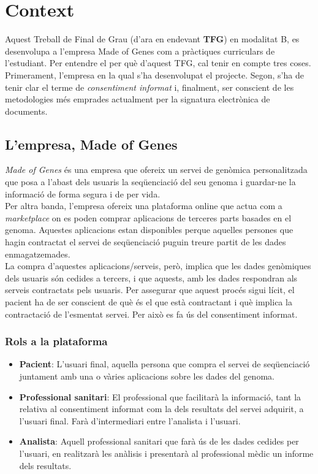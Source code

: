 \section{Context}

Aquest Treball de Final de Grau (d'ara en endevant \textbf{TFG}) en modalitat B, es desenvolupa a l'empresa Made of Genes\cite{mog} com a pràctiques curriculars de l'estudiant.
\newline Per entendre el per què d'aquest TFG, cal tenir en compte tres coses. Primerament, l'empresa en la qual s'ha desenvolupat el projecte. 
\newline Segon, s'ha de tenir clar el terme de \textit{consentiment informat} i, finalment, ser conscient de les metodologies més emprades actualment per la signatura electrònica de documents.

\subsection{L'empresa, Made of Genes}
\textit{Made of Genes}\cite{mog} és una empresa que ofereix un servei de genòmica personalitzada que posa a l'abast dels usuaris la seqüenciació del seu genoma i guardar-ne la informació de forma segura i de per vida.\\
Per altra banda, l'empresa ofereix una plataforma online que actua com a \textit{marketplace} on es poden comprar aplicacions de terceres parts basades en el genoma.
Aquestes aplicacions estan disponibles perque aquelles persones que hagin contractat el servei de seqüenciació puguin treure partit de les dades enmagatzemades.\\
\newline La compra d'aquestes aplicacions/serveis, però, implica que les dades genòmiques dels usuaris són cedides a  tercers, i que aquests, amb les dades respondran als serveis contractats pels usuaris. 
\newline Per assegurar que aquest procés sigui lícit, el pacient ha de ser conscient de què és el que està contractant i què implica la contractació de l'esmentat servei. Per això es fa ús del consentiment informat.

\subsubsection{Rols a la plataforma}
\begin{itemize}
	\item \textbf{Pacient}: L'usuari final, aquella persona que compra el servei de seqüenciació juntament amb una o vàries aplicacions sobre les dades del genoma.
	\item \textbf{Professional sanitari}: El professional que facilitarà la informació, tant la relativa al consentiment informat com la dels resultats del servei adquirit, a l'usuari final. Farà d'intermediari entre l'analista i l'usuari.
	\item \textbf{Analista}: Aquell professional sanitari que farà ús de les dades cedides per l'usuari, en realitzarà les anàlisis i presentarà al professional mèdic un informe dels resultats.
\end{itemize}

